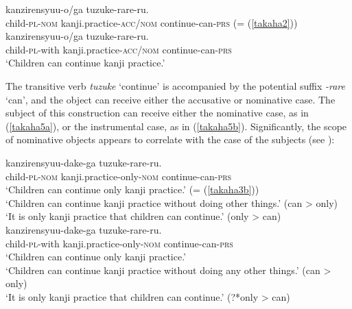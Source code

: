 \documentclass[output=paper]{langscibook}
\begin{document}
\begin{exe}
\ex \label{takaha5}
\begin{xlist}
\ex \label{takaha5a}
 {kanzirensyuu-o/ga} {tuzuke-rare-ru.}\\
	child-\textsc{pl}-\textsc{nom}  kanji.practice-\textsc{acc/nom} continue-can-\textsc{prs} (= (\ref{takaha2}))\\ 
	
\ex \label{takaha5b}
 {kanzirensyuu-o/ga} {tuzuke-rare-ru.}\\
	child-\textsc{pl}-with       kanji.practice-\textsc{acc/nom} continue-can-\textsc{prs}\\
\glt `Children can continue kanji practice.' \\
\end{xlist}
\end{exe}

The transitive verb \emph{tuzuke} ‘continue’ is accompanied by the potential suffix \emph{-rare} ‘can’, and the object can receive either the accusative or nominative case. The subject of this construction can receive either the nominative case, as in (\ref{takaha5a}), or the instrumental case, as in (\ref{takaha5b}). Significantly, the scope of nominative objects appears to correlate with the case of the subjects (see \citealt{Ebina2020}):

\begin{exe}
\ex 
\begin{xlist}
\ex \label{takaha6a}
 {kanzirensyuu-dake-ga} {tuzuke-rare-ru.}\\
	child-\textsc{pl}-\textsc{nom}       kanji.practice-only-\textsc{nom} continue-can-\textsc{prs}\\
\glt `Children can continue only kanji practice.’ (= (\ref{takaha3b}))\\
‘Children can continue kanji practice without doing other things.’ (can \textgreater{} only)\\
‘It is only kanji practice that children can continue.’ (only \textgreater{} can)
\\

\ex \label{takaha6b}
 {kanzirensyuu-dake-ga} {tuzuke-rare-ru.}\\
	child-\textsc{pl}-with kanji.practice-only-\textsc{nom} continue-can-\textsc{prs}\\
\glt `Children can continue only kanji practice.’\\
`Children can continue kanji practice without doing any other things.' (can \textgreater{} only)\\
`It is only kanji practice that children can continue.’ (?*only \textgreater{} can)
\end{xlist}
\end{exe}
\end{document}
